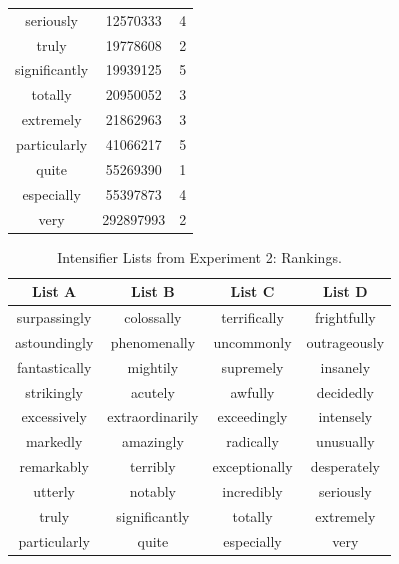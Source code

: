 \documentclass[10pt,letterpaper]{article}
\begin{document}
\begin{table}[ht]
\begin{center}
\begin{tabular}{ccc}
    seriously & 12570333 & 4 \\
    truly & 19778608 & 2 \\
    significantly & 19939125 & 5 \\
    totally & 20950052 & 3 \\
    extremely & 21862963 & 3 \\
    particularly & 41066217 & 5 \\
    quite & 55269390 & 1 \\
    especially & 55397873 & 4 \\
    very & 292897993 & 2
  \end{tabular}
 \end{center}
\end{table}


\begin{table}[ht]
\begin{center} 
\caption{Intensifier Lists from Experiment 2: Rankings.} 
\label{exp2-intensifiers} 
\vskip 0.12in
\begin{tabular}{cccc} 
\hline
List A    &  List B & List C & List D \\
\hline
surpassingly & colossally & terrifically & frightfully \\
astoundingly & phenomenally & uncommonly & outrageously \\
fantastically & mightily & supremely & insanely \\
strikingly & acutely & awfully & decidedly \\
excessively & extraordinarily & exceedingly & intensely \\
markedly & amazingly & radically & unusually \\
remarkably & terribly & exceptionally & desperately \\
utterly & notably & incredibly & seriously \\
truly & significantly & totally & extremely \\
particularly & quite & especially & very
\end{tabular}
\end{center}
\end{table}
\end{document}
